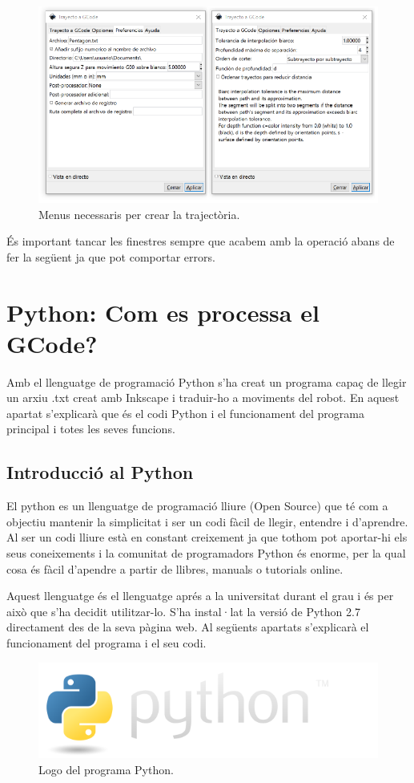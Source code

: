\begin{itemize}
	\begin{figure}[H]
		\centering
		\includegraphics[width=0.60\linewidth]{5Trajectoria.eps}
		\caption{Menus necessaris per crear la trajectòria.}
		\label{fig:trayecto}
	\end{figure}
	
\end{itemize}
És important tancar les finestres sempre que acabem amb la operació abans de fer la següent ja que pot comportar errors. 

\section{Python: Com es processa el GCode?}

Amb el llenguatge de programació Python s’ha creat un programa capaç de llegir un arxiu .txt creat amb Inkscape i traduir-ho a moviments del robot. En aquest apartat s’explicarà que és el codi Python i el funcionament del programa principal i totes les seves funcions. 

\subsection{Introducció al Python}
El python es un llenguatge de programació lliure (Open Source) que té com a objectiu mantenir la simplicitat i ser un codi fàcil de llegir, entendre i d’aprendre. Al ser un codi lliure està en constant creixement ja que tothom pot aportar-hi els seus coneixements i la comunitat de programadors Python és enorme, per la qual cosa és fàcil d’apendre a partir de llibres, manuals o tutorials online. 

Aquest llenguatge és el llenguatge aprés a la universitat durant el grau i és per això que s’ha decidit utilitzar-lo. S’ha instal·lat la versió de Python 2.7 directament des de la seva pàgina web. Al següents apartats s’explicarà el funcionament del programa i el seu codi. 

\begin{figure}[H]
	\centering
	\includegraphics[scale=0.5]{python-logo.png}
	\caption{Logo del programa Python.}
	\label{fig:pythonlogo}
\end{figure}

